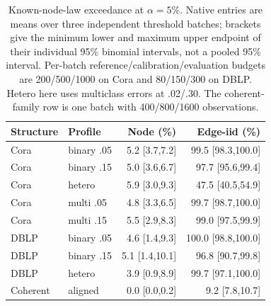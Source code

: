 \begin{table}[htbp]
\centering\small
\setlength{\tabcolsep}{4pt}
\begin{tabular}{llrr}
\toprule
Structure & Profile & Node (\%) & Edge-iid (\%) \\
\midrule
Cora & binary .05 & 5.2 [3.7,7.2] & 99.5 [98.3,100.0] \\
Cora & binary .15 & 5.0 [3.6,6.7] & 97.7 [95.6,99.4] \\
Cora & hetero & 5.9 [3.0,9.3] & 47.5 [40.5,54.9] \\
Cora & multi .05 & 4.8 [3.3,6.5] & 99.7 [98.7,100.0] \\
Cora & multi .15 & 5.5 [2.9,8.3] & 99.0 [97.5,99.9] \\
DBLP & binary .05 & 4.6 [1.4,9.3] & 100.0 [98.8,100.0] \\
DBLP & binary .15 & 5.1 [1.4,10.1] & 96.8 [90.7,99.8] \\
DBLP & hetero & 3.9 [0.9,8.9] & 99.7 [97.1,100.0] \\
Coherent & aligned & 0.0 [0.0,0.2] & 9.2 [7.8,10.7] \\
\bottomrule
\end{tabular}
\caption{Known-node-law exceedance at $\alpha=5\%$. Native entries are means over three independent threshold batches; brackets give the minimum lower and maximum upper endpoint of their individual 95\% binomial intervals, not a pooled 95\% interval. Per-batch reference/calibration/evaluation budgets are 200/500/1000 on Cora and 80/150/300 on DBLP. Hetero here uses multiclass errors at .02/.30. The coherent-family row is one batch with 400/800/1600 observations.}
\label{tab:node-calibration}
\end{table}

